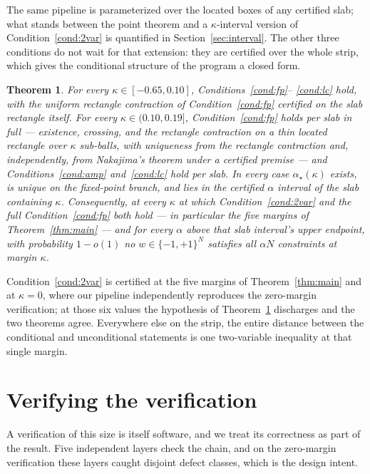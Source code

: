 \documentclass[11pt]{article}
\newtheorem{theorem}{Theorem}
\theoremstyle{remark}
\begin{document}
The same pipeline is parameterized over the located boxes of any
certified slab; what stands between the point theorem and a
$\kappa$-interval version of Condition~\ref{cond:2var} is quantified
in Section~\ref{sec:interval}.  The other three conditions do not
wait for that extension: they are certified over the whole strip,
which gives the conditional structure of the program a closed form.

\begin{theorem}\label{thm:strip}
For every $\kappa\in[-0.65,0.10]$, Conditions~\ref{cond:fp}--%
\ref{cond:lc} hold, with the uniform rectangle contraction of
Condition~\ref{cond:fp} certified on the slab rectangle itself.  For
every $\kappa\in(0.10,0.19]$, Condition~\ref{cond:fp} holds per slab
in full --- existence, crossing, and the rectangle contraction on a
thin located rectangle over $\kappa$ sub-balls, with uniqueness from
the rectangle contraction and, independently, from Nakajima's
theorem under a certified premise --- and Conditions~\ref{cond:amp}
and~\ref{cond:lc} hold per slab.  In every case
$\alpha_\star(\kappa)$ exists, is unique on the fixed-point branch,
and lies in the certified $\alpha$ interval of the slab containing
$\kappa$.  Consequently, at every $\kappa$ at which
Condition~\ref{cond:2var} and the full Condition~\ref{cond:fp} both
hold --- in particular the five margins of
Theorem~\ref{thm:main} --- and for every $\alpha$ above that slab
interval's upper endpoint, with probability $1-o(1)$ no
$w\in\{-1,+1\}^N$ satisfies all $\alpha N$ constraints at margin
$\kappa$.
\end{theorem}

Condition~\ref{cond:2var} is certified at the five margins of
Theorem~\ref{thm:main} and at $\kappa=0$, where our pipeline
independently reproduces the zero-margin verification; at those six
values the hypothesis of Theorem~\ref{thm:strip} discharges and the
two theorems agree.  Everywhere else on the strip, the entire
distance between the conditional and unconditional statements is one
two-variable inequality at that single margin.





\section{Verifying the verification}\label{sec:metaverify}

A verification of this size is itself software, and we treat its
correctness as part of the result.  Five independent layers check the
chain, and on the zero-margin verification these layers caught
disjoint defect classes, which is the design intent.
\end{document}
